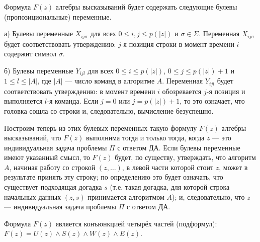 \documentclass[a4paper,12pt]{article}
\begin{document}
Формула \(F(z)\) алгебры высказываний будет содержать следующие булевы (пропозициональные) переменные.

а) Булевы переменные \(X_{ij\sigma}\) для всех \(0 \le i, j \le p(|z|)\) и \(\sigma \in \Sigma\). Переменная \(X_{ij\sigma}\) будет соответствовать утверждению: \(j\)-я позиция строки в момент времени \(i\) содержит символ \(\sigma\).

б) Булевы переменные \(Y_{ijl}\) для всех \(0 \le i \le p(|z|)\), \(0 \le j \le p(|z|) + 1\) и \(1 \le l \le |A|\), где \(|A|\) --- число команд в алгоритме \(A\). Переменная \(Y_{ijl}\) будет соответствовать утверждению: в момент времени \(i\) обозревается \(j\)-я позиция и выполняется \(l\)-я команда. Если \(j = 0\) или \(j = p(|z|) + 1\), то это означает, что головка сошла со строки и, следовательно, вычисление безуспешно.

Построим теперь из этих булевых переменных такую формулу \(F(z)\) алгебры высказываний, что \(F(z)\) выполнима тогда и только тогда, когда \(z\) --- это индивидуальная задача проблемы \(\Pi\) с ответом ДА. Если булевы переменные имеют указанный смысл, то \(F(z)\) будет, по существу, утверждать, что алгоритм \(A\), начиная работу со строкой \((z, \dots)\), в левой части которой стоит \(z\), может в результате принять эту строку; по определению это будет означать, что существует подходящая догадка \(s\) (т.е. такая догадка, для которой строка начальных данных \((z, s)\) принимается алгоритмом \(A\)); и, следовательно, что \(z\) --- индивидуальная задача проблемы \(\Pi\) с ответом ДА.

Формула \(F(z)\) является конъюнкцией четырёх частей (подформул): \(F(z) = U(z) \land S(z) \land W(z) \land E(z)\).
\end{document}
